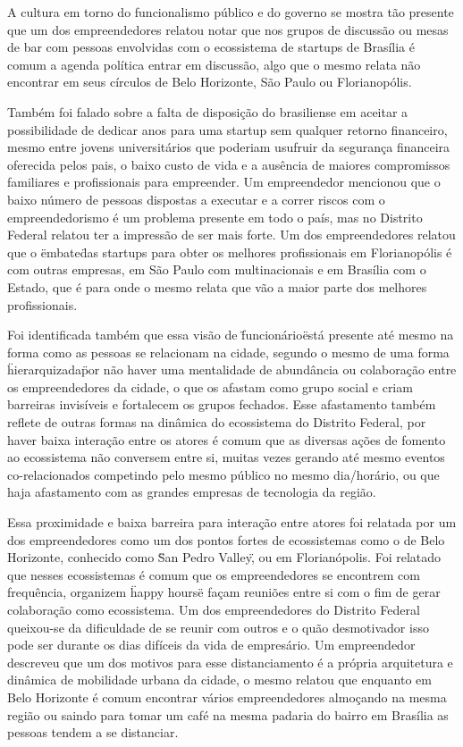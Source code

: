 A cultura em torno do funcionalismo público e do governo se mostra tão presente que um dos empreendedores relatou notar que nos grupos de discussão ou mesas de bar com pessoas envolvidas com o ecossistema de startups de Brasília é comum a agenda política entrar em discussão, algo que o mesmo relata não encontrar em seus círculos de Belo Horizonte, São Paulo ou Florianopólis.

Também foi falado sobre a falta de disposição do brasiliense em aceitar a possibilidade de dedicar anos para uma startup sem qualquer retorno financeiro, mesmo entre jovens universitários que poderiam usufruir da segurança financeira oferecida pelos pais, o baixo custo de vida e a ausência de maiores compromissos familiares e profissionais para empreender. Um empreendedor mencionou que o baixo número de pessoas dispostas a executar e a correr riscos com o empreendedorismo é um problema presente em todo o país, mas no Distrito Federal relatou ter a impressão de ser mais forte. Um dos empreendedores relatou que o \"embate\" das startups para obter os melhores profissionais em Florianopólis é com outras empresas, em São Paulo com multinacionais e em Brasília com o Estado, que é para onde o mesmo relata que vão a maior parte dos melhores profissionais.

Foi identificada também que essa visão de \"funcionário\" está presente até mesmo na forma como as pessoas se relacionam na cidade, segundo o mesmo de uma forma \"hierarquizada\" por não haver uma mentalidade de abundância ou colaboração entre os empreendedores da cidade, o que os afastam como grupo social e criam barreiras invisíveis e fortalecem os grupos fechados. Esse afastamento também reflete de outras formas na dinâmica do ecossistema do Distrito Federal, por haver baixa interação entre os atores é comum que as diversas ações de fomento ao ecossistema não conversem entre si, muitas vezes gerando até mesmo eventos co-relacionados competindo pelo mesmo público no mesmo dia/horário, ou que haja afastamento com as grandes empresas de tecnologia da região.

Essa proximidade e baixa barreira para interação entre atores foi relatada por um dos empreendedores como um dos pontos fortes de ecossistemas como o de Belo Horizonte, conhecido como \"San Pedro Valley\", ou em Florianópolis. Foi relatado que nesses ecossistemas é comum que os empreendedores se encontrem com frequência, organizem \"happy hours\" e façam reuniões entre si com o fim de gerar colaboração como ecossistema. Um dos empreendedores do Distrito Federal queixou-se da dificuldade de se reunir com outros e o quão desmotivador isso pode ser durante os dias difíceis da vida de empresário. Um empreendedor descreveu que um dos motivos para esse distanciamento é a própria arquitetura e dinâmica de mobilidade urbana da cidade, o mesmo relatou que enquanto em Belo Horizonte é comum encontrar vários empreendedores almoçando na mesma região ou saindo para tomar um café na mesma padaria do bairro em Brasília as pessoas tendem a se distanciar.

